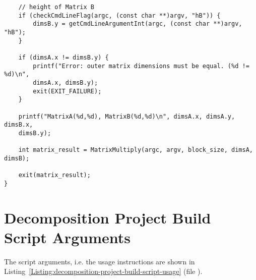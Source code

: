 \begin{lstlisting}
	// height of Matrix B
	if (checkCmdLineFlag(argc, (const char **)argv, "hB")) {
		dimsB.y = getCmdLineArgumentInt(argc, (const char **)argv, "hB");
	}
	
	if (dimsA.x != dimsB.y) {
		printf("Error: outer matrix dimensions must be equal. (%d != %d)\n",
		dimsA.x, dimsB.y);
		exit(EXIT_FAILURE);
	}
	
	printf("MatrixA(%d,%d), MatrixB(%d,%d)\n", dimsA.x, dimsA.y, dimsB.x,
	dimsB.y);
	
	int matrix_result = MatrixMultiply(argc, argv, block_size, dimsA, dimsB);
	
	exit(matrix_result);
}
\end{lstlisting}




\chapter{Decomposition Project Build Script Arguments}\label{Attachment:decomposition-project-build-script-parameters}
The  script arguments, i.e. the usage instructions are shown in Listing~\ref{Listing:decomposition-project-build-script-usage} (file ).
